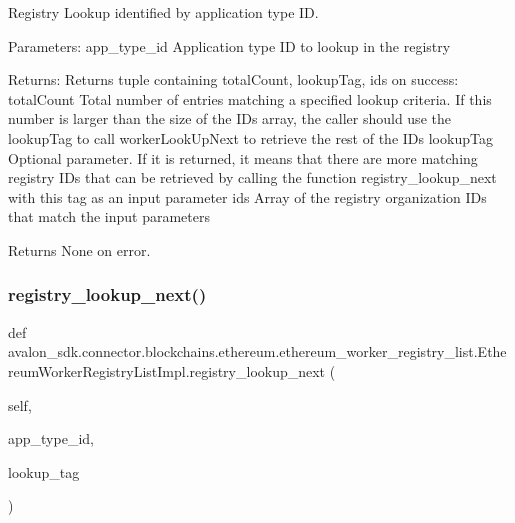 \begin{DoxyVerb}Registry Lookup identified by application type ID.

Parameters:
app_type_id  Application type ID to lookup in the registry

Returns:
Returns tuple containing totalCount, lookupTag, ids on success:
totalCount Total number of entries matching a specified
   lookup criteria.  If this number is larger than the size
   of the IDs array, the caller should use the lookupTag to
   call workerLookUpNext to retrieve the rest of the IDs
lookupTag  Optional parameter. If it is returned, it means that
   there are more matching registry IDs that can be retrieved
   by calling the function registry_lookup_next with this tag
   as an input parameter
ids        Array of the registry organization IDs that match the
   input parameters

Returns None on error.
\end{DoxyVerb}
 \mbox{\label{classavalon__sdk_1_1connector_1_1blockchains_1_1ethereum_1_1ethereum__worker__registry__list_1_1EthereumWorkerRegistryListImpl_a1219341d2a9161ada781cde3d8b20a7c}} 
\subsubsection{\texorpdfstring{registry\+\_\+lookup\+\_\+next()}{registry\_lookup\_next()}}
{\footnotesize\ttfamily def avalon\+\_\+sdk.\+connector.\+blockchains.\+ethereum.\+ethereum\+\_\+worker\+\_\+registry\+\_\+list.\+Ethereum\+Worker\+Registry\+List\+Impl.\+registry\+\_\+lookup\+\_\+next (\begin{DoxyParamCaption}\item[{}]{self,  }\item[{}]{app\+\_\+type\+\_\+id,  }\item[{}]{lookup\+\_\+tag }\end{DoxyParamCaption})}

